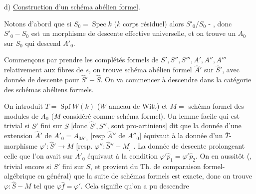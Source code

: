 d) \uline{Construction d'un schéma abélien formel}.

Notons d'abord que si $S_0=\operatorname{Spec}k$ ($k$ corps résiduel) alors $S'_0/S_0$ - , donc $S'_0\mathbin{-}S_0$ est un morphisme de descente effective universelle, et on trouve un $A_0$ sur $S_0$ qui descend $A'_0$.

Commençons par prendre les complétés formels de $S',S'',S''',A',A'',A'''$  relativement aux fibres de $s$, on trouve  schéma abélien formel $\widehat A'$ sur $\widehat S'$, avec donnée de descente pour $\widehat S'\mathbin{-}\widehat S$. On va commencer à descendre dans la catégorie des schémas abéliens formels.

On introduit $\overline T=\operatorname{Spf}W(k)$ ($W$ anneau de Witt) et $M=$ schéma formel des modules de $A_0$ ($M$ considéré comme schéma formel). Un lemme facile qui est  trivial si $S'$ fini sur $S$ [donc $\widehat S',\widehat S''$,  sont pro-artiniens] dit que la donnée d'une extension  $\widehat A'$ de $A'_0=A_{0S'_0}$ [resp $\widehat A''$ de $A''_0$] équivaut à la donnée d'un $\overline T$-morphisme $\varphi':\widehat S'\longrightarrow M$ [resp. $\varphi'':\widehat S''\mathbin{-}M$] \deleted{\unsure{resp.} $\widehat S'''\mathbin{-}M$]}.
La donnée de descente  prolongeant celle que l'on avait sur $A'_0$ équivaut à la condition $\varphi'\widehat p_1=\varphi'\widehat p_2$. On en  aussitôt (, trivial encore si $S'$ fini sur $S$, et provient du Th. de comparaison formel-algébrique en général) que la suite
de schémas formels est exacte, donc on trouve $\varphi:\widehat S\mathbin{-}M$ tel que $\varphi\widehat f=\varphi'$. Cela signifie qu'on a pu descendre

